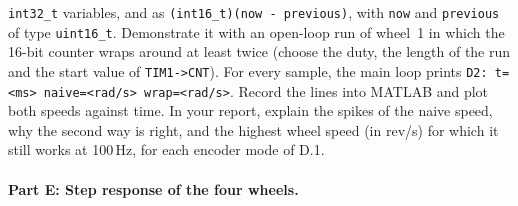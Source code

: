 \documentclass[11pt,a4paper]{article}
\begin{document}
\begin{enumerate}[label=D.\arabic*, leftmargin=2.2em]
        \texttt{int32\_t} variables, and as \texttt{(int16\_t)(now - previous)}, with \texttt{now} and
        \texttt{previous} of type \texttt{uint16\_t}. Demonstrate it with an open-loop run of wheel~1 in which the
        16-bit counter wraps around at least twice (choose the duty, the length of the run and the start value of
        \texttt{TIM1->CNT}). For every sample, the main loop prints \texttt{D2: t=<ms> naive=<rad/s> wrap=<rad/s>}.
        Record the lines into MATLAB and plot both speeds against time. In your report, explain the spikes of the
        naive speed, why the second way is right, and the highest wheel speed (in rev/s) for which it still works at
        100\,Hz, for each encoder mode of D.1.
\end{enumerate}

\paragraph{Part E: Step response of the four wheels.}
\end{document}
